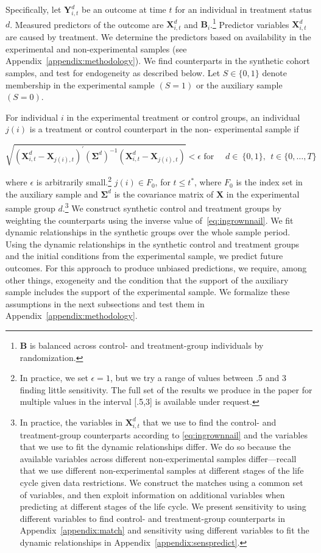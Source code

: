 Specifically, let $\bm{Y}^{d}_{i,t}$ be an outcome at time $t$ for an individual in treatment status $d$. Measured predictors of the outcome are $\bm{X}^{d}_{i,t}$ and $\bm{B}_i$.\footnote{$\bm{B}$ is balanced across control- and treatment-group individuals by randomization.} Predictor variables $\bm{X}^{d}_{i,t}$ are caused by treatment. We determine the predictors based on availability in the experimental and non-experimental samples (see Appendix~\ref{appendix:methodology}). We find counterparts in the synthetic cohort samples, and test for endogeneity as described below. Let $S \in \{ 0,1\}$ denote membership in the experimental sample $(S=1)$ or the auxiliary sample $(S=0)$.

For individual $i$ in the experimental treatment or control groups, an individual $j(i)$ is a treatment or control counterpart in the non- experimental sample if

\begin{equation}\label{eq:ingrownnail}
\sqrt{\left( \bm{X}^{d}_{i,t} - \bm{X}_{j(i),t} \right)^{\prime} {\left( \bm{\Sigma}^d\right)}^{-1} \left(\bm{X}^{d}_{i,t} - \bm{X}_{j(i),t} \right)} < \epsilon \text{ for } \quad d \in \ \{0,1\}, \ \ t \in \{0,\dots,T\}
\end{equation}

\noindent where $\epsilon$ is arbitrarily small.\footnote{In practice, we set $\epsilon = 1$, but we try a range of values between .5 and 3 finding little sensitivity. The full set of the results we produce in the paper for multiple values in the interval [.5,3] is available under request.} $j(i) \in F_0$, for $t \leq t^{\ast}$, where $F_0$ is the index set in the auxiliary sample and $\bm{\Sigma}^d$ is the covariance matrix of $\bm{X}$ in the experimental sample group $d$.\footnote{In practice, the variables in $\bm{X}^{d}_{i,t}$ that we use to find the control- and treatment-group counterparts according to \eqref{eq:ingrownnail} and the variables that we use to fit the dynamic relationships differ. We do so because the available variables across different non-experimental samples differ---recall that we use different non-experimental samples at different stages of the life cycle given data restrictions. We construct the matches using a common set of variables, and then exploit information on additional variables when predicting at different stages of the life cycle. We present sensitivity to using different variables to find control- and treatment-group counterparts in Appendix~\ref{appendix:match} and sensitivity using different variables to fit the dynamic relationships in Appendix~\ref{appendix:senspredict}.} We construct synthetic control and treatment groups by weighting the counterparts using the inverse value of~\eqref{eq:ingrownnail}. We fit dynamic relationships in the synthetic groups over the whole sample period. Using the dynamic relationships in the synthetic control and treatment groups and the initial conditions from the experimental sample, we predict future outcomes. For this approach to produce unbiased predictions, we require, among other things, exogeneity and the condition that the support of the auxiliary sample includes the support of the experimental sample. We formalize these assumptions in the next subsections and test them in Appendix~\ref{appendix:methodology}.

